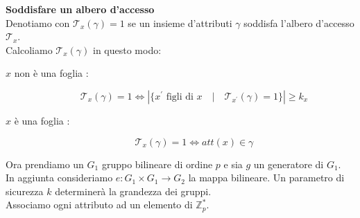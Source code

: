 \textbf{Soddisfare un albero d'accesso}\\
Denotiamo con $\mathcal{T}_x(\gamma) = 1$ se un insieme d'attributi $\gamma$ soddisfa l'albero d'accesso $\mathcal{T}_x$.\\
Calcoliamo $\mathcal{T}_x(\gamma)$ in questo modo:
\begin{description}
\item[$x$ non è una foglia :] \[\mathcal{T}_x(\gamma) = 1  \Leftrightarrow\left\lvert \{x^\prime \text{ figli di } x \quad|\quad \mathcal{T}_{x^\prime}(\gamma) = 1  \} \right\rvert \geq k_x\]
\item[$x$ è una foglia :] \[\mathcal{T}_x(\gamma) = 1 \Leftrightarrow att(x) \in \gamma\]
\end{description}

Ora prendiamo un $G_1$ gruppo bilineare di ordine $p$ e sia $g$ un generatore di $G_1$.\\
In aggiunta consideriamo $e : G_1 \times G_1 \rightarrow G_2$ la mappa bilineare. Un parametro di sicurezza $k$ determinerà la grandezza dei gruppi.\\
Associamo ogni attributo ad un elemento di $\mathbb{Z}_p^*$.\\

